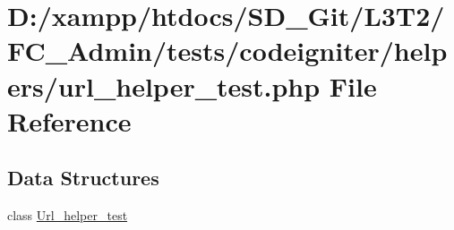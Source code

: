 \hypertarget{url__helper__test_8php}{}\section{D\+:/xampp/htdocs/\+S\+D\+\_\+\+Git/\+L3\+T2/\+F\+C\+\_\+\+Admin/tests/codeigniter/helpers/url\+\_\+helper\+\_\+test.php File Reference}
\label{url__helper__test_8php}
\subsection*{Data Structures}
\begin{DoxyCompactItemize}
\item 
class \hyperlink{class_url__helper__test}{Url\+\_\+helper\+\_\+test}
\end{DoxyCompactItemize}
